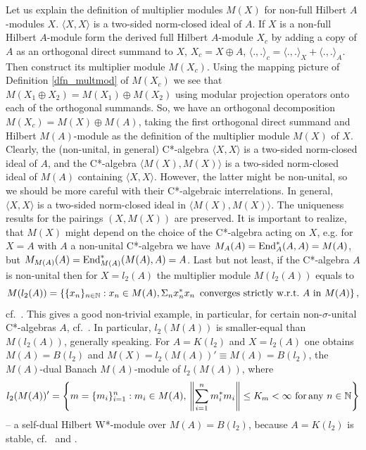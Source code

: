 \documentclass{amsart}
\theoremstyle{definition}
\begin{document}
Let us explain the definition of multiplier modules $M(X)$ for non-full Hilbert $A$-modules $X$. $\langle X,X \rangle$ is a two-sided norm-closed ideal of $A$. If $X$ is a non-full Hilbert $A$-module form the derived full Hilbert $A$-module $X_c$ by adding a copy of $A$ as an orthogonal direct summand to $X$, $X_c = X \oplus A$, $\langle .,. \rangle_c = \langle .,. \rangle_X+ \langle .,. \rangle_A$. Then construct its multiplier module $M(X_c)$. Using the mapping picture of Definition \ref{dfn_multmod} of $M(X_c)$ we see that $M(X_1 \oplus X_2) = M(X_1) \oplus M(X_2)$ using modular projection operators onto each of the orthogonal summands. So, we have an orthogonal decomposition $M(X_c) = M(X) \oplus M(A)$, taking the first orthogonal direct summand and Hilbert $M(A)$-module as the definition of the multiplier module $M(X)$ of $X$. Clearly, the (non-unital, in general) C*-algebra $\langle X,X \rangle$ is a two-sided norm-closed ideal of $A$, and the C*-algebra  $\langle M(X), M(X) \rangle$ is a two-sided norm-closed ideal of $M(A)$ containing $\langle X,X \rangle$. However, the latter might be non-unital, so we should be more careful with their C*-algebraic interrelations. In general,  $\langle X,X \rangle$ is a two-sided norm-closed ideal in $\langle M(X), M(X) \rangle$. The uniqueness results for the pairings $(X,M(X))$ are preserved.  It is important to realize, that $M(X)$ might depend on the choice of the C*-algebra acting on $X$, e.g. for $X=A$ with $A$ a non-unital C*-algebra we have $M_A(A)= {\rm End}_A^*(A,A)=M(A)$, but $M_{M(A)}(A)={\rm End}_{M(A)}^*(M(A),A)= A$. Last but not least, if the C*-algebra $A$ is non-unital then for $X=l_2(A)$ the multiplier module $M(l_2(A))$ equals to 
\[
   M(l_2(A))= \{ \{x_n\}_{n \in {\mathbb N}} : x_n \in M(A), \Sigma_n x_n^*x_n \,\ {\rm converges} \,\,{\rm strictly} \,\, {\rm w.r.t.} \,\, A \,\, {\rm in} \,\,M(A) \} \, ,
\]
cf.~\cite[Thm.~2.1]{BG_2004}. This gives a good non-trivial example, in particular, for certain non-$\sigma$-unital C*-algebras $A$, cf.~\cite[Ex.~2.2]{BG_2004}. In particular, $l_2(M(A))$ is smaller-equal than $M(l_2(A))$, generally speaking. For $A=K(l_2)$ and $X=l_2(A)$ one obtains $M(A)=B(l_2)$ and $M(X)= l_2(M(A))' \equiv  M(A) = B(l_2)$, the $M(A)$-dual Banach $M(A)$-module of $l_2(M(A))$, where
\[
   l_2(M(A))' = \left\{ m=\{ m_i\}_{i=1}^n : m_i \in M(A), \, \left\| \sum_{i=1}^n m_i^*m_i \right\| \leq K_m < \infty \,\, {\rm for} \, {\rm any} \,\, n \in {\mathbb N} \right\}
\]
 -- a self-dual Hilbert W*-module over $M(A)=B(l_2)$, because $A=K(l_2)$ is stable, cf.~\cite[Ex.~2.2]{BG_2004} and \cite{Paschke}.
\end{document}
